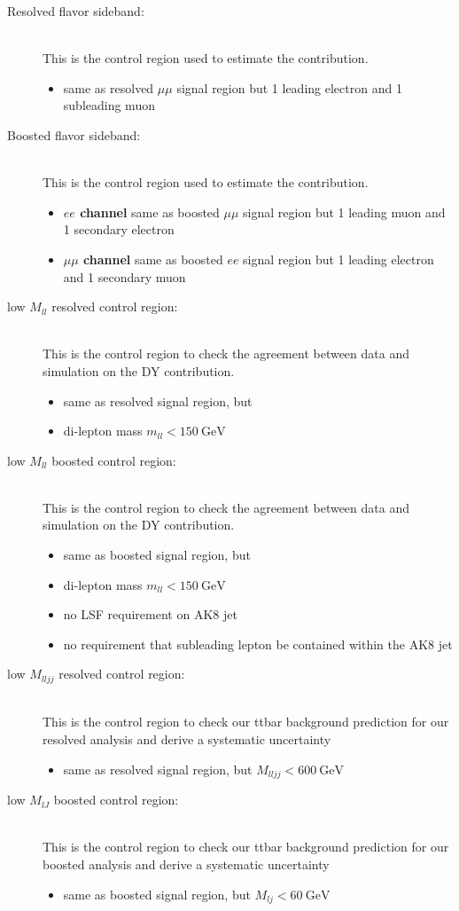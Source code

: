 \begin{description}
\item[Resolved flavor sideband:]\ \\  This is the control region used to estimate the \ttbar contribution.
  \begin{itemize}
  \item same as resolved $\mu\mu$ signal region but 1 leading electron and 1 subleading muon
  \end{itemize}
\item[Boosted flavor sideband:]\ \\  This is the control region used to estimate the \ttbar contribution.
  \begin{itemize}
  \item \textbf{$ee$ channel} same as boosted $\mu\mu$ signal region but 1 leading muon and 1 secondary electron
  \item \textbf{$\mu\mu$ channel} same as boosted $ee$ signal region but 1 leading electron and 1 secondary muon
  \end{itemize}
\item[low $M_{ll}$ resolved control region:]\ \\ This is the control region to check the agreement between data and simulation on the DY contribution.
  \begin{itemize}
  \item same as resolved signal region, but
  \item di-lepton mass $m_{ll} < \SI{150}{\GeV}$
  \end{itemize}
\item[low $M_{ll}$ boosted control region:]\ \\ This is the control region to check the agreement between data and simulation on the DY contribution.
  \begin{itemize}
  \item same as boosted signal region, but
  \item di-lepton mass $m_{ll} < \SI{150}{\GeV}$
  \item no LSF requirement on AK8 jet
  \item no requirement that subleading lepton be contained within the AK8 jet
  \end{itemize}
\item[low $M_{lljj}$ resolved control region:]\ \\ This is the control region to check our ttbar background prediction for our resolved analysis and derive a systematic uncertainty
  \begin{itemize}
  \item same as resolved signal region, but $M_{l l j j} < \SI{600}{\GeV}$
  \end{itemize}
\item[low $M_{lJ}$ boosted control region:]\ \\This is the control region to check our ttbar background prediction for our boosted analysis and derive a systematic uncertainty
  \begin{itemize}
  \item same as boosted signal region, but $M_{l j} < \SI{60}{\GeV}$
  \end{itemize}

\end{description}

